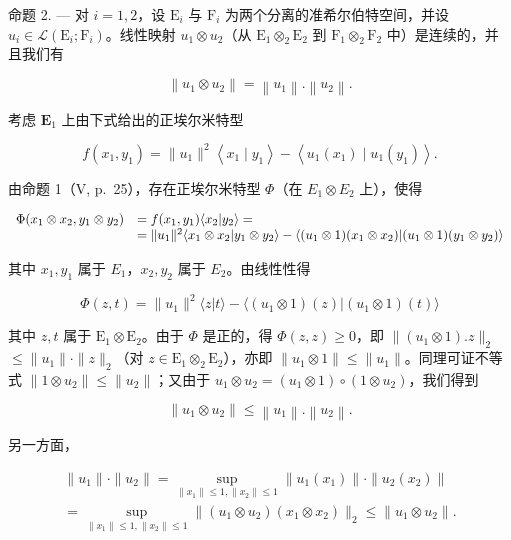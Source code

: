 命题 2. --- 对 \(i = 1, 2\)，设 \(\mathrm{E}_{i}\) 与 \(\mathrm{F}_{i}\) 为两个分离的准希尔伯特空间，并设 \(u_{i} \in \mathcal{L}(\mathrm{E}_{i}; \mathrm{F}_{i})\)。线性映射 \(u_{1} \otimes u_{2}\)（从 \(\mathrm{E}_{1} \otimes_{2} \mathrm{E}_{2}\) 到 \(\mathrm{F}_{1} \otimes_{2} \mathrm{F}_{2}\) 中）是连续的，并且我们有

\[
\left\| u _ {1} \otimes u _ {2} \right\| = \left\| u _ {1} \right\|. \left\| u _ {2} \right\|.
\]

考虑 \(\mathbf{E}_1\) 上由下式给出的正埃尔米特型

\[
f \left(x _ {1}, y _ {1}\right) = \| u _ {1} \| ^ {2} \left\langle x _ {1} \mid y _ {1} \right\rangle - \left\langle u _ {1} \left(x _ {1}\right) \mid u _ {1} \left(y _ {1}\right) \right\rangle .
\]

由命题 1（V, p.~25），存在正埃尔米特型 \(\Phi\)（在 \(E_1 \otimes E_2\) 上），使得

\[
\begin{array}{r l} \Phi (x _ {1} \otimes x _ {2}, y _ {1} \otimes y _ {2}) & = f (x _ {1}, y _ {1}) \langle x _ {2} | y _ {2} \rangle = \\ & = \| u _ {1} \| ^ {2} \langle x _ {1} \otimes x _ {2} | y _ {1} \otimes y _ {2} \rangle - \langle (u _ {1} \otimes 1) (x _ {1} \otimes x _ {2}) | (u _ {1} \otimes 1) (y _ {1} \otimes y _ {2}) \rangle \end{array}
\]

其中 \(x_{1}, y_{1}\) 属于 \(E_{1}\)，\(x_{2}, y_{2}\) 属于 \(E_{2}\)。由线性性得

\[
\Phi (z, t) = \| u _ {1} \| ^ {2} \langle z | t \rangle - \langle (u _ {1} \otimes 1) (z) | (u _ {1} \otimes 1) (t) \rangle
\]

其中 \(z, t\) 属于 \(\mathrm{E}_1 \otimes \mathrm{E}_2\)。由于 \(\Phi\) 是正的，得 \(\Phi(z, z) \geqslant 0\)，即 \(\| (u_1 \otimes 1).z \|_2\) \(\leqslant \| u_1\| \cdot \| z\| _2\)（对 \(z\in \mathrm{E}_1\otimes_2\mathrm{E}_2\)），亦即 \(\| u_1\otimes 1\| \leqslant \| u_1\|\)。同理可证不等式 \(\| 1\otimes u_2\| \leqslant \| u_2\|\)；又由于 \(u_{1}\otimes u_{2} = (u_{1}\otimes 1)\circ (1\otimes u_{2})\)，我们得到

\[
\left\| u _ {1} \otimes u _ {2} \right\| \leqslant \left\| u _ {1} \right\|. \left\| u _ {2} \right\|.
\]

另一方面，

\[
\begin{array}{l} \| u _ {1} \| \cdot \| u _ {2} \| = \sup _ {\| x _ {1} \| \leqslant 1, \| x _ {2} \| \leqslant 1} \| u _ {1} (x _ {1}) \| \cdot \| u _ {2} (x _ {2}) \| \\ = \sup _ {\| x _ {1} \| \leqslant 1, \| x _ {2} \| \leqslant 1} \| (u _ {1} \otimes u _ {2}) (x _ {1} \otimes x _ {2}) \| _ {2} \leqslant \| u _ {1} \otimes u _ {2} \|. \end{array}
\]


